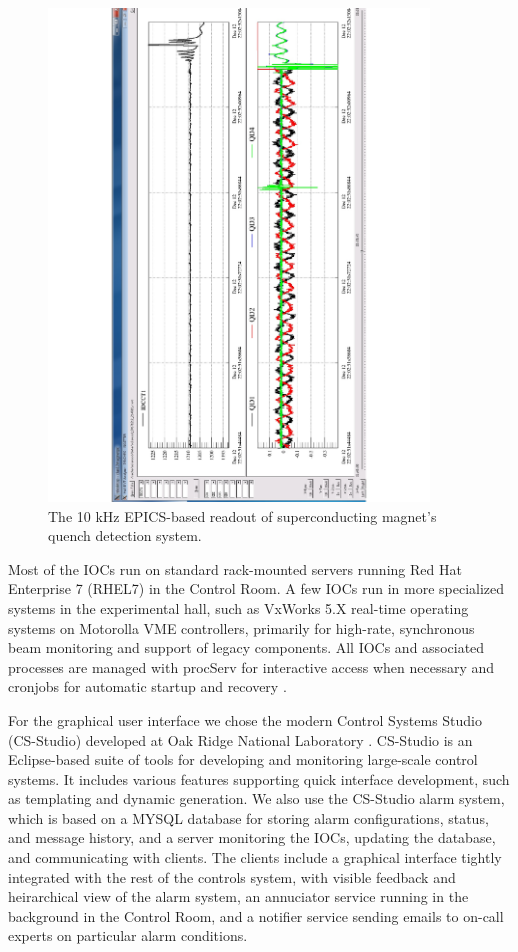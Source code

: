 \begin{figure}[t]\centering
\includegraphics[width=0.9\textwidth]{img/tordaq}
\caption{The 10 kHz EPICS-based readout of superconducting magnet's quench detection system.\label{fig:tordaq}}
\end{figure}

Most of the IOCs run on standard rack-mounted servers running Red Hat Enterprise 7 (RHEL7) in the Control Room.  A few IOCs run in more specialized systems in the experimental hall, such as VxWorks 5.X real-time operating systems on Motorolla VME controllers, primarily for high-rate, synchronous beam monitoring and support of legacy components.  All IOCs and associated processes are managed with procServ for interactive access when necessary and cronjobs for automatic startup and recovery \cite{procserv-website}.

For the graphical user interface we chose the modern Control Systems Studio (CS-Studio) developed at Oak Ridge National Laboratory \cite{css-website}.   CS-Studio is an Eclipse-based suite of tools for developing and monitoring large-scale control systems.  It includes various features supporting quick interface development, such as templating and dynamic generation.  We also use the CS-Studio alarm system, which is based on a MYSQL database for storing alarm configurations, status, and message history, and a server monitoring the IOCs, updating the database, and communicating with clients.  The clients include a graphical interface tightly integrated with the rest of the controls system, with visible feedback and heirarchical view of the alarm system, an annuciator service running in the background in the Control Room, and a notifier service sending emails to on-call experts on particular alarm conditions.

